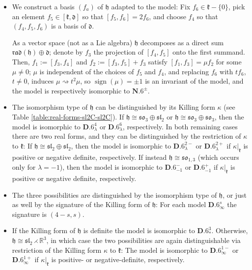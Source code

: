 \documentclass[pdftex]{sigma}
\DeclareMathOperator{\sign}{sign}
\newcommand{\bbR}{\mathbb{R}}
\newcommand{\mfd} {\mathfrak{d}}
\newcommand{\mfh} {\mathfrak{h}}
\newcommand{\mfk} {\mathfrak{k}}
\newcommand{\mfrad}{\mathfrak{rad}}
\newcommand{\mfsl} {\mathfrak{sl}}
\newcommand{\mfso} {\mathfrak{so}}
\numberwithin{equation}{section}
\begin{document}
\begin{itemize}[leftmargin=1.5cm]\itemsep=0pt
\item[\textbf{$\mathbf{N.6}$}] We construct a basis $(f_a)$ of $\mfh$ adapted to the model: Fix $f_6 \in \mfk - \{ 0 \}$, pick an element $f_5 \in [\mfk, \mfd]$ so that $[f_5, f_6] = 2 f_6$, and choose $f_4$ so that $(f_4, f_5, f_6)$ is a basis of $\mfd$.

As a vector space (not as a Lie algebra) $\mfh$ decomposes as a direct sum $\mfrad(\mfh) \oplus \mfd$; denote by $f_3$ the projection of $[f_4, f_5]$ onto the first summand. Then, $f_1 := [f_3, f_4]$ and $f_2 := [f_3, f_5] + f_3$ satisfy $[f_1, f_3] = \mu f_2$ for some $\mu \neq 0$; $\mu$ is independent of the choices of $f_5$ and $f_4$, and replacing $f_6$ with $t f_6$, $t \neq 0$, induces $\mu \rightsquigarrow t^2 \mu$, so $\sign(\mu) = \pm 1$ is an invariant of the model, and the model is respectively isomorphic to $\mathbf{N.6}^{\pm}$.

\item[\textbf{$\mathbf{D.6}_{\lambda}$}] The isomorphism type of $\mfh$ can be distinguished by its Killing form $\kappa$ (see Table \ref{table:real-forms-sl2C-sl2C}). If $\mfh \cong \mfso_3 \oplus \mfsl_2$ or $\mfh \cong \mfso_3 \oplus \mfso_3$, then the model is isomorphic to $\mathbf{D.6}_{\lambda}^4$ or $\mathbf{D.6}_{\lambda}^6$, respectively. In both remaining cases there are two real forms, and they can be distinguished by the restriction of $\kappa$ to $\mfk$: If $\mfh \cong \mfsl_2 \oplus \mfsl_2$, then the model is isomorphic to $\mathbf{D.6}_{\lambda}^{2-}$ or $\mathbf{D.6}_{\lambda}^{2+}$ if $\kappa\vert_{\mfk}$ is positive or negative definite, respectively. If instead $\mfh \cong \mfso_{1, 3}$ (which occurs only for $\lambda = -1$), then the model is isomorphic to $\mathbf{D.6}_{-1}^-$ or $\mathbf{D.6}_{-1}^+$ if $\kappa\vert_{\mfk}$ is positive or negative definite, respectively.

\item[\textbf{$\mathbf{D.6}_{\infty}$}] The three possibilities are distinguished by the isomorphism type of $\mfh$, or just as well by the signature of the Killing form of $\mfh$: For each model $\mathbf{D.6}_{\infty}^s$ the signature is $(4 - s, s)$.

\item[\textbf{$\mathbf{D.6}_{\ast}$}] If the Killing form of $\mfh$ is definite the model is isomorphic to $\mathbf{D.6}_{\ast}^3$. Otherwise, $\mfh \cong \mfsl_2 \rightthreetimes \bbR^3$, in which case the two possibilities are again distinguishable via restriction of the Killing form $\kappa$ to $\mfk$: The model is isomorphic to $\mathbf{D.6}_{\infty}^{1-}$ or $\mathbf{D.6}_{\infty}^{1+}$ if $\kappa\vert_{\mfk}$ is positive- or negative-definite, respectively.
\end{itemize}
\end{document}
